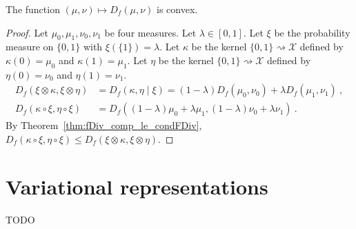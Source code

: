 \begin{theorem}
  \label{thm:fDiv_convex}
  The function $(\mu, \nu) \mapsto D_f(\mu, \nu)$ is convex.
\end{theorem}

\begin{proof}
Let $\mu_0, \mu_1, \nu_0, \nu_1$ be four measures. Let $\lambda \in [0,1]$. Let $\xi$ be the probability measure on $\{0,1\}$ with $\xi(\{1\}) = \lambda$.
Let $\kappa$ be the kernel $\{0,1\} \rightsquigarrow \mathcal X$ defined by $\kappa(0) = \mu_0$ and $\kappa(1) = \mu_1$.
Let $\eta$ be the kernel $\{0,1\} \rightsquigarrow \mathcal X$ defined by $\eta(0) = \nu_0$ and $\eta(1) = \nu_1$.
\begin{align*}
D_f(\xi \otimes \kappa, \xi \otimes \eta)
&= D_f(\kappa, \eta \mid \xi)
= (1 - \lambda) D_f(\mu_0, \nu_0) + \lambda D_f(\mu_1, \nu_1)
\: , \\
D_f(\kappa \circ \xi, \eta \circ \xi)
&= D_f((1 - \lambda)\mu_0 + \lambda \mu_1, (1 - \lambda)\nu_0 + \lambda \nu_1)
\: .
\end{align*}
By Theorem~\ref{thm:fDiv_comp_le_condFDiv}, $D_f(\kappa \circ \xi, \eta \circ \xi) \le D_f(\xi \otimes \kappa, \xi \otimes \eta)$.
\end{proof}

\section{Variational representations}

TODO